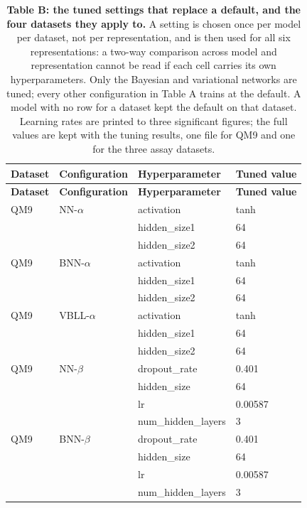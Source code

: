 
{\small
\begin{longtable}{@{}llll@{}}
\caption{\textbf{Table B: the tuned settings that replace a default, and the four datasets they apply to.}
A setting is chosen once per model per dataset, not per representation, and is then used for all six representations: a two-way comparison across model and representation cannot be read if each cell carries its own hyperparameters. Only the Bayesian and variational networks are tuned; every other configuration in Table A trains at the default. A model with no row for a dataset kept the default on that dataset. Learning rates are printed to three significant figures; the full values are kept with the tuning results, one file for QM9 and one for the three assay datasets.}
\label{af1:tuned}\\
\toprule
\textbf{Dataset} & \textbf{Configuration} & \textbf{Hyperparameter} & \textbf{Tuned value} \\
\midrule
\endfirsthead
\toprule
\textbf{Dataset} & \textbf{Configuration} & \textbf{Hyperparameter} & \textbf{Tuned value} \\
\midrule
\endhead
QM9 & NN-$\alpha$ & activation & tanh \\
 &  & hidden\_size1 & 64 \\
 &  & hidden\_size2 & 64 \\
\addlinespace
QM9 & BNN-$\alpha$ & activation & tanh \\
 &  & hidden\_size1 & 64 \\
 &  & hidden\_size2 & 64 \\
\addlinespace
QM9 & VBLL-$\alpha$ & activation & tanh \\
 &  & hidden\_size1 & 64 \\
 &  & hidden\_size2 & 64 \\
\addlinespace
QM9 & NN-$\beta$ & dropout\_rate & 0.401 \\
 &  & hidden\_size & 64 \\
 &  & lr & 0.00587 \\
 &  & num\_hidden\_layers & 3 \\
\addlinespace
QM9 & BNN-$\beta$ & dropout\_rate & 0.401 \\
 &  & hidden\_size & 64 \\
 &  & lr & 0.00587 \\
 &  & num\_hidden\_layers & 3 \\

\end{longtable}}
